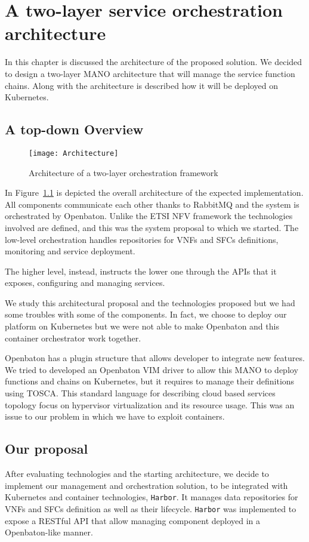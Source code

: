 \chapter{A two-layer service orchestration architecture}
\label{chap:archimpl}
 
In this chapter is discussed the architecture of the proposed solution.
We decided to design a two-layer MANO architecture that will manage
the service function chains. Along with the architecture is described how it
will be deployed on Kubernetes.

\section{A top-down Overview}
\begin{figure}[H]
  \centering
  \texttt{[image: Architecture]}
  \caption{Architecture of a two-layer orchestration framework}
  \label{chap:archimpl:img:architecture}
\end{figure}
In Figure~\ref{chap:archimpl:img:architecture} is depicted the overall
architecture of the expected implementation. All components communicate each
other thanks to RabbitMQ and the system is orchestrated by Openbaton. Unlike the
ETSI NFV framework the technologies involved are defined, and this was the
system proposal to which we started. The low-level orchestration handles
repositories for VNFs and SFCs definitions, monitoring and service deployment.

The higher level, instead, instructs the lower one through the APIs that it
exposes, configuring and managing services. 

We study this architectural proposal and the technologies proposed but we had
some troubles with some of the components. In fact, we choose to deploy our
platform on Kubernetes but we were not able to make Openbaton and this container
orchestrator work together.

Openbaton has a plugin structure that allows developer to integrate new
features. We tried to developed an Openbaton VIM driver to allow this MANO to
deploy functions and chains on Kubernetes, but it requires to manage their
definitions using TOSCA. This standard language for describing cloud based
services topology focus on hypervisor virtualization and its resource usage.
This was an issue to our problem in which we have to exploit containers.

\section{Our proposal}
After evaluating technologies and the starting architecture, we decide to
implement our management and orchestration solution, to be integrated with
Kubernetes and container technologies, \texttt{Harbor}. It manages data
repositories for VNFs and SFCs definition as well as their lifecycle.
\texttt{Harbor} was implemented to expose a RESTful API that allow managing
component deployed in a Openbaton-like manner. 

